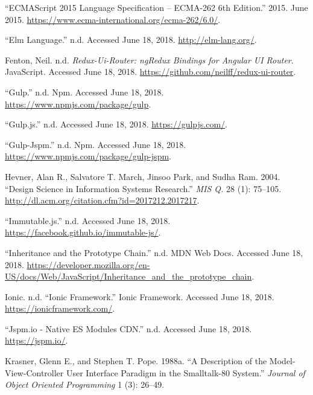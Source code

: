 \documentclass[a4paper,,tablecaptionabove]{scrbook}
\begin{document}
\leavevmode\hypertarget{ref-ECMAScript2015Language2015}{}%
``ECMAScript 2015 Language Specification -- ECMA-262 6th Edition.''
2015. June 2015. \url{https://www.ecma-international.org/ecma-262/6.0/}.

\leavevmode\hypertarget{ref-ElmLanguage}{}%
``Elm Language.'' n.d. Accessed June 18, 2018.
\url{http://elm-lang.org/}.

\leavevmode\hypertarget{ref-FentonreduxuirouterngReduxbindings}{}%
Fenton, Neil. n.d. \emph{Redux-Ui-Router: ngRedux Bindings for Angular
UI Router}. JavaScript. Accessed June 18, 2018.
\url{https://github.com/neilff/redux-ui-router}.

\leavevmode\hypertarget{ref-gulp}{}%
``Gulp.'' n.d. Npm. Accessed June 18, 2018.
\url{https://www.npmjs.com/package/gulp}.

\leavevmode\hypertarget{ref-gulpjs}{}%
``Gulp.js.'' n.d. Accessed June 18, 2018. \url{https://gulpjs.com/}.

\leavevmode\hypertarget{ref-gulpjspm}{}%
``Gulp-Jspm.'' n.d. Npm. Accessed June 18, 2018.
\url{https://www.npmjs.com/package/gulp-jspm}.

\leavevmode\hypertarget{ref-HevnerDesignScienceInformation2004}{}%
Hevner, Alan R., Salvatore T. March, Jinsoo Park, and Sudha Ram. 2004.
``Design Science in Information Systems Research.'' \emph{MIS Q.} 28
(1): 75--105. \url{http://dl.acm.org/citation.cfm?id=2017212.2017217}.

\leavevmode\hypertarget{ref-Immutablejs}{}%
``Immutable.js.'' n.d. Accessed June 18, 2018.
\url{https://facebook.github.io/immutable-js/}.

\leavevmode\hypertarget{ref-Inheritanceprototypechain}{}%
``Inheritance and the Prototype Chain.'' n.d. MDN Web Docs. Accessed
June 18, 2018.
\url{https://developer.mozilla.org/en-US/docs/Web/JavaScript/Inheritance_and_the_prototype_chain}.

\leavevmode\hypertarget{ref-IonicIonicFramework}{}%
Ionic. n.d. ``Ionic Framework.'' Ionic Framework. Accessed June 18,
2018. \url{https://ionicframework.com/}.

\leavevmode\hypertarget{ref-jspmioNative}{}%
``Jspm.io - Native ES Modules CDN.'' n.d. Accessed June 18, 2018.
\url{https://jspm.io/}.

\leavevmode\hypertarget{ref-Krasnerdescriptionmodelviewcontrolleruser1988}{}%
Krasner, Glenn E., and Stephen T. Pope. 1988a. ``A Description of the
Model-View-Controller User Interface Paradigm in the Smalltalk-80
System.'' \emph{Journal of Object Oriented Programming} 1 (3): 26--49.
\end{document}
